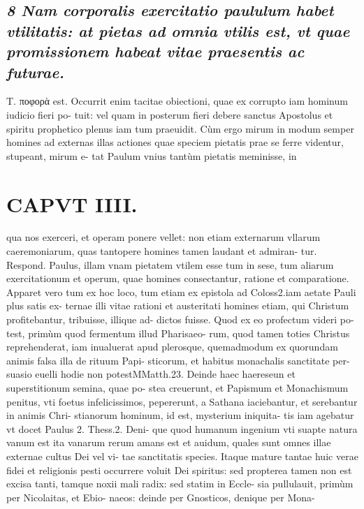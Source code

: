 \documentclass{article}
\begin{document}
\begin{pages}
\subsection*{\textit{8 Nam corporalis exercitatio paululum habet vtilitatis: at pietas ad omnia vtilis est, vt quae promissionem habeat vitae praesentis ac futurae. }}\pstart Τ. ποφορὰ est. Occurrit enim tacitae obiectioni, quae ex corrupto iam hominum iudicio fieri po- tuit: vel quam in posterum fieri debere sanctus Apostolus et spiritu prophetico plenus iam tum praeuidit. Cùm ergo mirum in modum semper homines ad externas illas actiones quae speciem pietatis prae se ferre videntur, stupeant, mirum e- tat Paulum vnius tantùm pietatis meminisse, in  \pend
\section*{CAPVT  IIII. }
\marginpar{[ p.209 ]}\pstart qua nos exerceri, et operam ponere vellet: non etiam externarum vllarum caeremoniarum, quas tantopere homines tamen laudant et admiran- tur. Respond. Paulus, illam vnam pietatem vtilem esse tum in sese, tum aliarum exercitationum et operum, quae homines consectantur, ratione et comparatione.  \pend\pstart Apparet vero tum ex hoc loco, tum etiam ex epistola ad Coloss2.iam aetate Pauli plus satis ex- ternae illi vitae rationi et austeritati homines etiam, qui Christum profitebantur, tribuisse, illique ad- dictos fuisse. Quod ex eo profectum videri po- test, primùm quod fermentum illud Pharisaeo- rum, quod tamen toties Christus reprehenderat, iam inualuerat apud plerosque, quemadmodum ex quorundam animis falsa illa de rituum Papi- sticorum, et habitus monachalis sanctitate per- suasio euelli hodie non potestMMatth.23. Deinde haec haereseun et superstitionum semina, quae po- stea creuerunt, et Papismum et Monachismum penitus, vti foetus infelicissimos, pepererunt, a Sathana iaciebantur, et serebantur in animis Chri- stianorum hominum, id est, mysterium iniquita- tis iam agebatur vt docet Paulus 2. Thess.2. Deni- que quod humanum ingenium vti suapte natura vanum est ita vanarum rerum amans est et auidum, quales sunt omnes illae externae cultus Dei vel vi- tae sanctitatis species. Itaque mature tantae huic verae fidei et religionis pesti occurrere voluit Dei spiritus: sed propterea tamen non est excisa tanti, tamque  noxii mali radix: sed statim in Eccle- sia pullulauit, primùm per Nicolaitas, et Ebio- naeos: deinde per Gnosticos, denique per Mona-  \pend

\end{pages}
\end{document}
